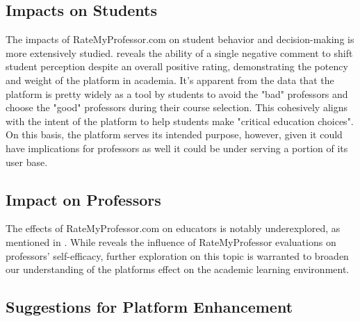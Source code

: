 \documentclass[man,12pt]{apa7}
\begin{document}
\subsection*{Impacts on Students}
The impacts of RateMyProfessor.com on student behavior and decision-making is more extensively studied. \textcite{scherr_single_2013} reveals the ability of a single negative comment to shift student perception despite an overall positive rating, demonstrating the potency and weight of the platform in academia. It's apparent from the data that the platform is pretty widely as a tool by students to avoid the "bad" professors and choose the "good" professors during their course selection. This cohesively aligns with the intent of the platform to help students make "critical education choices". On this basis, the platform serves its intended purpose, however, given it could have implications for professors as well it could be under serving a portion of its user base.

\subsection*{Impact on Professors}
The effects of RateMyProfessor.com on educators is notably underexplored, as mentioned in \textcite{boswell_ratemyprofessors_2016}. While \textcite*{boswell_ratemyprofessors_2016} reveals the influence of RateMyProfessor evaluations on professors' self-efficacy, further exploration on this topic is warranted to broaden our understanding of the platforms effect on the academic learning environment.

\subsection*{Suggestions for Platform Enhancement}







\end{document}
